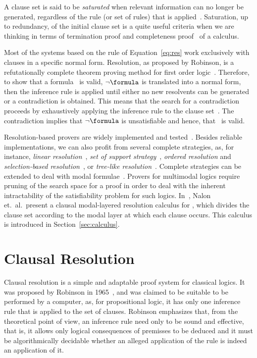 A clause set is said to be \emph{saturated} when relevant information can no
longer be generated, regardless of the rule (or set of rules) that is
applied~\cite{dershowitz2003abstract}. Saturation, up to redundancy, of the
initial clause set is a quite useful criteria when we are thinking in terms of
termination proof and completeness proof~\cite{fitting} of a calculus.

Most of the systems based on the rule of Equation~\ref{eq:res} work exclusively
with clauses in a specific normal form. Resolution, as proposed by Robinson, is
a refutationally complete theorem proving method for first order
logic~\cite{Robinson65}.  Therefore, to show that a formula \formula~is valid,
$\neg \formula$ is translated into a normal form, then the inference rule is
applied until either no new resolvents can be generated or a contradiction is
obtained. This means that the search for a contradiction proceeds by
exhaustively applying the inference rule to the clause
set~\cite{bachmair2001resolution}. The contradiction implies that $\neg
\formula$ is unsatisfiable and hence, that \formula~is valid. 

Resolution-based provers are widely implemented and
tested~\cite{bachmair2001resolution}. Besides reliable implementations, we can
also profit from several complete strategies, as, for instance, \emph{linear
resolution}~\cite{casanova}, \emph{set of support
strategy}~\cite{wos1965efficiency}, \emph{ordered resolution} and
\emph{selection-based resolution}~\cite{de2000resolution}, or \emph{tree-like
resolution}~\cite{satchapter}. Complete strategies can be extended to deal with
modal formulae~\cite{journals/jal/NalonD07}. Provers for multimodal logics
require pruning of the search space for a proof in order to deal with the
inherent intractability of the satisfiability problem for such logics.
In~\cite{nalon2015modal}, Nalon et.\ al.\ present a clausal modal-layered
resolution calculus for , which divides the clause set according
to the modal layer at which each clause occurs. This calculus is introduced in
Section~\ref{sec:calculus}.

\section{Clausal Resolution}

Clausal resolution is a simple and adaptable proof system for classical logics.
It was proposed by Robinson in 1965~\cite{Robinson65}, and was claimed to be
suitable to be performed by a computer, as, for propositional logic, it has only
one inference rule that is applied to the set of clauses. Robinson
emphasizes that, from the theoretical point of view, an inference rule need only
to be sound and effective, that is, it allows only logical consequences of
premisses to be deduced and it must be algorithmically decidable whether an
alleged application of the rule is indeed an application of it.

